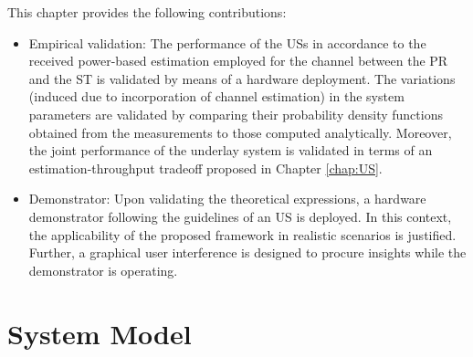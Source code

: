 This chapter provides the following contributions:
\begin{itemize}
	\item Empirical validation: The performance of the USs in accordance to the received power-based estimation employed for the channel between the PR and the ST is validated by means of a hardware deployment. The variations (induced due to incorporation of channel estimation) in the system parameters are validated by comparing their probability density functions obtained from the measurements to those computed analytically. Moreover, the joint performance of the underlay system is validated in terms of an estimation-throughput tradeoff proposed in Chapter \ref{chap:US}. %
	\item Demonstrator: Upon validating the theoretical expressions, a hardware demonstrator following the guidelines of an US is deployed. In this context, the applicability of the proposed framework in realistic scenarios is justified. Further, a graphical user interference is designed to procure insights while the demonstrator is operating.	
\end{itemize}



\section{System Model}
\label{sysmod}

